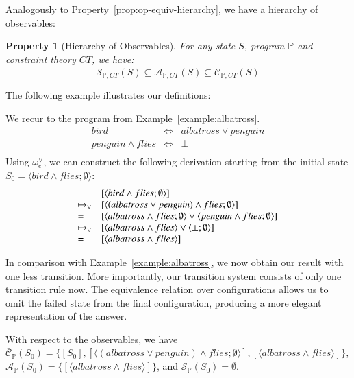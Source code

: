 \documentclass[acmtocl]{acmtrans2m}
\newtheorem{property}[theorem]{Property}
\newcommand\state[1]{\langle #1 \rangle}
\newcommand{\oesqv}{\ensuremath{\omega^\vee_e}}
\newcommand{\bbP}{\ensuremath{\mathbb{P}}}
\newcommand{\bcA}{\ensuremath{\bar{\mathcal{A}}}}
\newcommand{\bcS}{\ensuremath{\bar{\mathcal{S}}}}
\newcommand{\bcC}{\ensuremath{\bar{\mathcal{C}}}}
\begin{document}
Analogously to Property~\ref{prop:op-equiv-hierarchy}, we have a hierarchy of
observables:

\begin{property}[Hierarchy of Observables]
For any state $S$, program $\bbP$ and constraint theory $CT$, we have:
\[
	\bcS_{\bbP,CT}(S) \subseteq \bcA_{\bbP,CT}(S) \subseteq \bcC_{\bbP,CT}(S)
\]
\end{property}

The following example illustrates our definitions:

\begin{example}
\label{example:albatross_vee}
We recur to the program from Example~\ref{example:albatross}.
\[
  \begin{array}{lcl}
    bird & \Leftrightarrow & albatross \vee penguin\\
    penguin\wedge flies & \Leftrightarrow & \bot\\
  \end{array}
\]
Using $\oesqv$, we can construct the following derivation starting from the
initial state $S_0=\state{bird\wedge flies;\emptyset}$:
\[
  \begin{array}{ l l}
    &	[\state{bird\wedge flies;\emptyset}]\\
    \mapsto_\vee & [\state{(albatross\vee penguin)\wedge flies;\emptyset}]\\
    = &
    [\state{albatross\wedge flies;\emptyset} \vee
        \state{penguin\wedge flies;\emptyset}]\\
    \mapsto_\vee & [\state{albatross\wedge flies} \vee
        \state{\bot;\emptyset}]\\
    =  &[\state{albatross\wedge flies}]\\
  \end{array}
\]

In comparison with Example~\ref{example:albatross}, we now obtain our result with
one less transition. More importantly, our transition system consists of only one
transition rule now. The equivalence relation over configurations allows us to
omit the failed state from the final configuration, producing a more elegant
representation of the answer.

With respect to the observables, we have $\bcC_{\bbP}(S_0)=
\{[S_0],[\state{(albatross\vee penguin)\wedge
flies;\emptyset}],[\state{albatross\wedge flies}]\}$, $\bcA_{\bbP}(S_0)=
\{[\state{albatross\wedge flies}]\}$, and $\bcS_{\bbP}(S_0)= \emptyset$.
\end{example}
\end{document}
